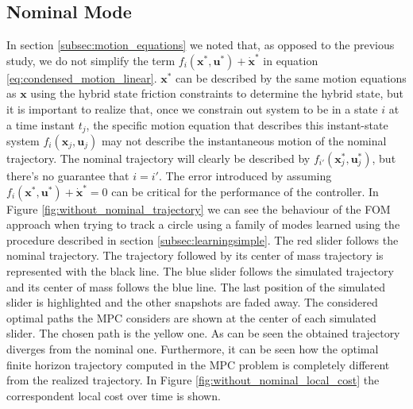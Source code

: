 \documentclass[12,twoside]{TFG-GM}
\theoremstyle{definition}
\theoremstyle{remark}
\begin{document}
\subsection{Nominal Mode}
\label{subsec:nominal_mode}
In section \ref{subsec:motion_equations} we noted that, as opposed to the previous study, we do not simplify the term $f_i(\textbf{x}^*, \textbf{u}^*) + \dot{\textbf{x}}^*$ in equation \ref{eq:condensed_motion_linear}. $\textbf{x}^*$ can be described by the same motion equations as $\textbf{x}$ using the hybrid state friction constraints to determine the hybrid state, but it is important to realize that, once we constrain out system to be in a state $i$ at a time instant $t_j$, the specific motion equation that describes this instant-state system $f_i(\textbf{x}_j, \textbf{u}_j)$ may not describe the instantaneous motion of the nominal trajectory. The nominal trajectory will clearly be described by $f_{i'}(\textbf{x}_j^*, \textbf{u}_j^*)$, but there's no guarantee that $i = i'$. The error introduced by assuming $f_i(\textbf{x}^*, \textbf{u}^*) + \dot{\textbf{x}}^* = 0$ can be critical for the performance of the controller. In Figure \ref{fig:without_nominal_trajectory} we can see the behaviour of the FOM approach when trying to track a circle using a family of modes learned using the procedure described in section \ref{subsec:learningsimple}. The red slider follows the nominal trajectory. The trajectory followed by its center of mass trajectory is represented with the black line. The blue slider follows the simulated trajectory and its center of mass follows the blue line. The last position of the simulated slider is highlighted and the other snapshots are faded away. The considered optimal paths the MPC considers are shown at the center of each simulated slider. The chosen path is the yellow one. As can be seen the obtained trajectory diverges from the nominal one. Furthermore, it can be seen how the optimal finite horizon trajectory computed in the MPC problem is completely different from the realized trajectory. In Figure \ref{fig:without_nominal_local_cost} the correspondent local cost over time is shown.
\end{document}
